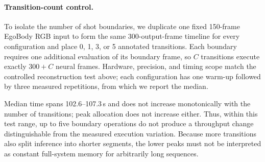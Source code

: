 \paragraph{Transition-count control.}
To isolate the number of shot boundaries, we duplicate one fixed 150-frame
EgoBody RGB input to form the same 300-output-frame timeline for every
configuration and place 0, 1, 3, or 5 annotated transitions. Each boundary
requires one additional evaluation of its boundary frame, so $C$ transitions
execute exactly $300+C$ neural frames. Hardware, precision, and timing scope
match the controlled reconstruction test above; each configuration has one
warm-up followed by three measured repetitions, from which we report the
median.

\begin{table}[t]
  \centering
  \caption{Controlled \method{} runtime and peak allocation versus the
  number of transitions, with 300 output frames. Peak is the maximum PyTorch
  allocated memory over the three measured runs.}
  \label{tab:transition-count-runtime}
  \supptablesize
  
\end{table}

Median time spans 102.6--107.3\,s and does not increase monotonically with the
number of transitions; peak allocation does not increase either. Thus, within
this test range, up to five boundary operations do not produce a throughput
change distinguishable from the measured execution variation. Because more
transitions also split inference into shorter segments, the lower peaks must
not be interpreted as constant full-system memory for arbitrarily long
sequences.
